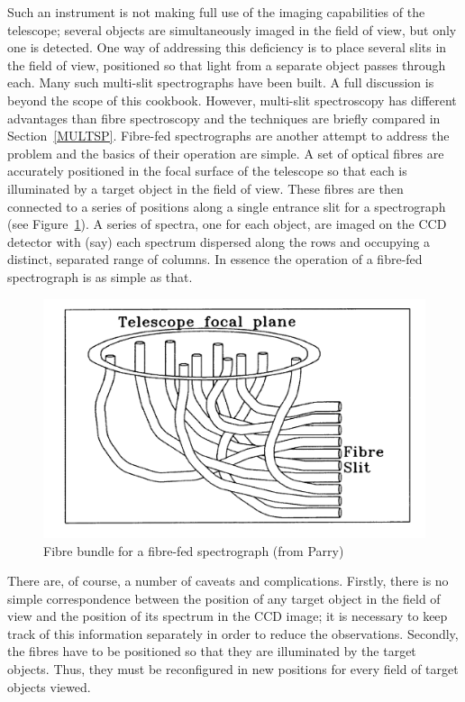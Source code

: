 \documentclass[chapters,twoside,11pt]{starlink}
\begin{document}
Such an instrument is not making full use of the imaging capabilities of
the telescope; several objects are simultaneously imaged in the field of
view, but only one is detected.  One way of addressing this deficiency is
to place several slits in the field of view, positioned so that light
from a separate object passes through each.  Many such multi-slit
spectrographs have been built.  A full discussion is beyond the scope of
this cookbook.  However, multi-slit spectroscopy has different advantages
than fibre spectroscopy and the techniques are briefly compared in
Section~\ref{MULTSP}.  Fibre-fed spectrographs are another
attempt to address the problem and the basics of their operation are
simple.  A set of optical fibres are accurately positioned in the focal
surface of the telescope so that each is illuminated by a target object in
the field of view.  These fibres are then connected to a series of
positions along a single entrance slit for a spectrograph (see
Figure~\ref{BUNDLE}).  A series of spectra, one for each object, are
imaged on the CCD detector with (say) each spectrum dispersed along the
rows and occupying a distinct, separated range of columns.  In essence
the operation of a fibre-fed spectrograph is as simple as that.

\begin{figure}[htbp]
   \centering
   \includegraphics[totalheight=4in]{sc14_bundle}
   \caption[Fibre bundle for a fibre-fed spectrograph]{Fibre bundle
    for a fibre-fed spectrograph (from Parry\cite{PARRY97, PARRY98})
   \label{BUNDLE} }
\end{figure}

There are, of course, a number of caveats and complications.  Firstly,
there is no simple correspondence between the position of any target
object in the field of view and the position of its spectrum
in the CCD image; it is necessary to keep track of this information
separately in order to reduce the observations.  Secondly, the fibres
have to be positioned so that they are illuminated by the target
objects.  Thus, they must be reconfigured in new positions for every
field of target objects viewed.
\end{document}
